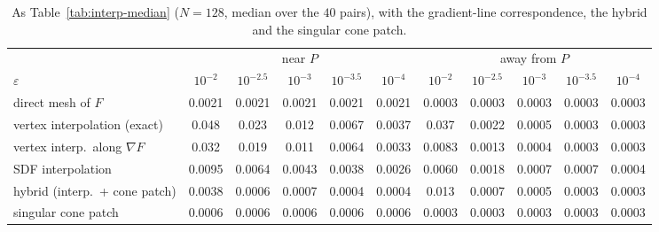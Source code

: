 \documentclass[12pt, a4paper]{article}
\theoremstyle{plain}
\theoremstyle{definition}
\theoremstyle{remark}
\theoremstyle{definition}
\begin{document}
\begin{table}[!ht]
\centering
\small
\begin{adjustbox}{max width=\textwidth}
\begin{tabular}{l c c c c c c c c c c}
\toprule
& \multicolumn{5}{c}{near $P$} & \multicolumn{5}{c}{away from $P$} \\
\cmidrule(lr){2-6}\cmidrule(lr){7-11}
$\varepsilon$ & $10^{-2}$ & $10^{-2.5}$ & $10^{-3}$ & $10^{-3.5}$ & $10^{-4}$ & $10^{-2}$ & $10^{-2.5}$ & $10^{-3}$ & $10^{-3.5}$ & $10^{-4}$ \\
\midrule
direct mesh of $F$ & 0.0021 & 0.0021 & 0.0021 & 0.0021 & 0.0021 & 0.0003 & 0.0003 & 0.0003 & 0.0003 & 0.0003 \\
vertex interpolation (exact) & 0.048 & 0.023 & 0.012 & 0.0067 & 0.0037 & 0.037 & 0.0022 & 0.0005 & 0.0003 & 0.0003 \\
vertex interp.\ along $\nabla F$ & 0.032 & 0.019 & 0.011 & 0.0064 & 0.0033 & 0.0083 & 0.0013 & 0.0004 & 0.0003 & 0.0003 \\
SDF interpolation & 0.0095 & 0.0064 & 0.0043 & 0.0038 & 0.0026 & 0.0060 & 0.0018 & 0.0007 & 0.0007 & 0.0004 \\
hybrid (interp.\ + cone patch) & 0.0038 & 0.0006 & 0.0007 & 0.0004 & 0.0004 & 0.013 & 0.0007 & 0.0005 & 0.0003 & 0.0003 \\
singular cone patch & 0.0006 & 0.0006 & 0.0006 & 0.0006 & 0.0006 & 0.0003 & 0.0003 & 0.0003 & 0.0003 & 0.0003 \\
\bottomrule
\end{tabular}
\end{adjustbox}
\caption[Reconstructions including the cone patch: median errors]{As
Table~\ref{tab:interp-median} ($N=128$, median over the $40$ pairs), with the
gradient-line correspondence, the hybrid and the singular cone patch.}
\label{tab:cone-median}
\end{table}
\end{document}
